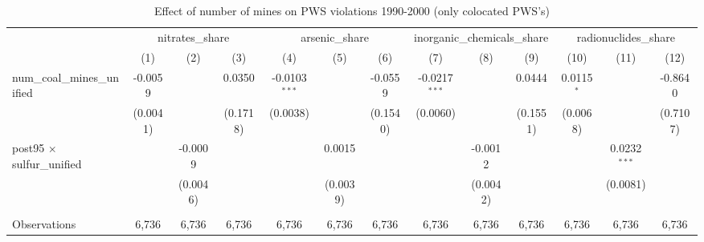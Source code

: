 
\begin{table}[htbp]
   \caption{\label{olsrf2sls_nummine_mine_vio_1990to2000colocate_coalunified} Effect of number of mines on PWS violations 1990-2000 (only colocated PWS's)}
   \bigskip
   \centering
   \begin{adjustbox}{width = \textwidth, center}
      \begin{tabular}{lcccccccccccc}
         \toprule
          & \multicolumn{3}{c}{nitrates\_share} & \multicolumn{3}{c}{arsenic\_share} & \multicolumn{3}{c}{inorganic\_chemicals\_share} & \multicolumn{3}{c}{radionuclides\_share}\\
                                                          & (1)           & (2)                   & (3)                   & (4)             & (5)                   & (6)                   & (7)             & (8)                   & (9)                   & (10)          & (11)           & (12)\\  
         \midrule 
         num\_coal\_mines\_unified                        & -0.0059       &                       & 0.0350                & -0.0103$^{***}$ &                       & -0.0559               & -0.0217$^{***}$ &                       & 0.0444                & 0.0115$^{*}$  &                & -0.8640\\   
                                                          & (0.0041)      &                       & (0.1718)              & (0.0038)        &                       & (0.1540)              & (0.0060)        &                       & (0.1551)              & (0.0068)      &                & (0.7107)\\   
         post95 $\times$ sulfur\_unified                  &               & -0.0009               &                       &                 & 0.0015                &                       &                 & -0.0012               &                       &               & 0.0232$^{***}$ &   \\   
                                                          &               & (0.0046)              &                       &                 & (0.0039)              &                       &                 & (0.0042)              &                       &               & (0.0081)       &   \\   
          \\
         Observations                                     & 6,736         & 6,736                 & 6,736                 & 6,736           & 6,736                 & 6,736                 & 6,736           & 6,736                 & 6,736                 & 6,736         & 6,736          & 6,736\\  

\end{tabular}
\end{adjustbox}
\end{table}
